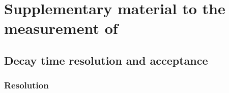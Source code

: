 
\chapter[
  head={Supplementary material to the measurement of \sintwobetait},
  tocentry={Supplementary material to the measurement of \sintwobetabfsfHyperref}
]
{Supplementary material to the measurement of \sintwobetabfsf}
\label{ch:app:measurement_of_sin2beta}

\section{Decay time resolution and acceptance}
\label{sec:app:measurement_of_sin2beta:resolution_and_acceptance}

\subsection{Resolution}
\label{sec:app:measurement_of_sin2beta:resolution_and_acceptance:resolution}


